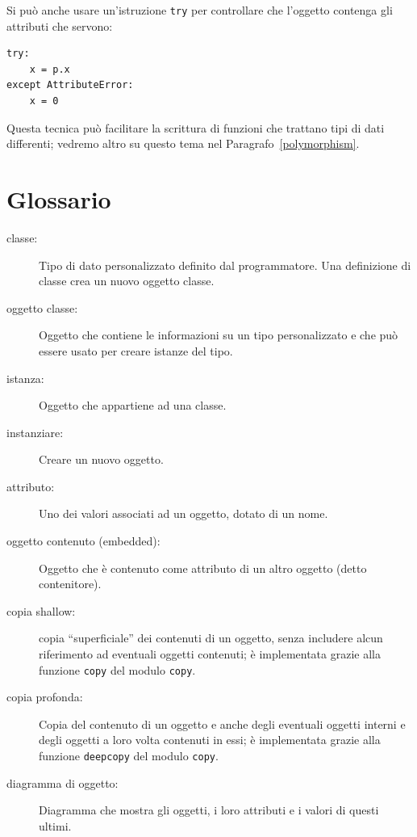 \documentclass[10pt]{book}
\begin{document}
Si può anche usare un'istruzione {\tt try} per controllare che l'oggetto contenga gli attributi che servono:

\begin{verbatim}
try:
    x = p.x
except AttributeError:
    x = 0
\end{verbatim}

Questa tecnica può facilitare la scrittura di funzioni che trattano tipi di dati differenti; vedremo altro su questo tema nel Paragrafo~\ref{polymorphism}.

\section{Glossario}

\begin{description}

\item[classe:] Tipo di dato personalizzato definito dal programmatore. Una definizione di classe crea un nuovo oggetto classe.

\item[oggetto classe:] Oggetto che contiene le informazioni su un tipo personalizzato e che può essere usato per creare istanze del tipo.

\item[istanza:] Oggetto che appartiene ad una classe.

\item[instanziare:] Creare un nuovo oggetto.

\item[attributo:] Uno dei valori associati ad un oggetto, dotato di un nome.

\item[oggetto contenuto (embedded):] Oggetto che è contenuto come attributo di un altro oggetto (detto contenitore).

\item[copia shallow:] copia ``superficiale'' dei contenuti di un oggetto, senza includere alcun riferimento ad eventuali oggetti contenuti; è implementata grazie alla funzione {\tt copy} del modulo {\tt copy}.

\item[copia profonda:] Copia del contenuto di un oggetto e anche degli eventuali
oggetti interni e degli oggetti a loro volta contenuti in essi; è implementata grazie alla funzione {\tt deepcopy} del modulo {\tt copy}.

\item[diagramma di oggetto:] Diagramma che mostra gli oggetti, i loro attributi e i valori di questi ultimi.

\end{description}
\end{document}
